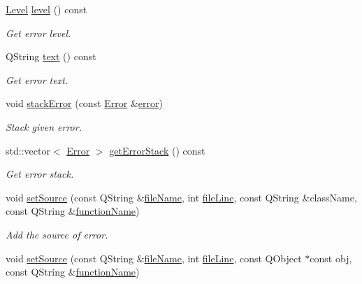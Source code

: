 \begin{DoxyCompactItemize}
\hyperlink{class_mdt_1_1_error_ab533dc690f68a8635232db594194a068}{Level} \hyperlink{class_mdt_1_1_error_a9c73117a49791ab87163b815d6a3e0c9}{level} () const 
\begin{DoxyCompactList}\small\item\em Get error level. \end{DoxyCompactList}\item 
Q\+String \hyperlink{class_mdt_1_1_error_a99327678615e8f2bddd22cd59482bfc2}{text} () const 
\begin{DoxyCompactList}\small\item\em Get error text. \end{DoxyCompactList}\item 
void \hyperlink{class_mdt_1_1_error_a4133276f217c5a6dac890a18059607cd}{stack\+Error} (const \hyperlink{class_mdt_1_1_error}{Error} \&\hyperlink{class_mdt_1_1_error_a0d042250a76d0351b8c19367572f5e11}{error})
\begin{DoxyCompactList}\small\item\em Stack given error. \end{DoxyCompactList}\item 
std\+::vector$<$ \hyperlink{class_mdt_1_1_error}{Error} $>$ \hyperlink{class_mdt_1_1_error_a6acc6143b706449ba1ff083286d5ccf6}{get\+Error\+Stack} () const 
\begin{DoxyCompactList}\small\item\em Get error stack. \end{DoxyCompactList}\item 
void \hyperlink{class_mdt_1_1_error_a785bdfbb360e3a29a465a9baeb1ac58b}{set\+Source} (const Q\+String \&\hyperlink{class_mdt_1_1_error_a5f7cdab03c2c0955693ace234039cd53}{file\+Name}, int \hyperlink{class_mdt_1_1_error_a5b887edc31341eb23557905e7a2d69ae}{file\+Line}, const Q\+String \&class\+Name, const Q\+String \&\hyperlink{class_mdt_1_1_error_a5706a74669219d9672ee20414f805cab}{function\+Name})
\begin{DoxyCompactList}\small\item\em Add the source of error. \end{DoxyCompactList}\item 
void \hyperlink{class_mdt_1_1_error_a38d1fb6f1d17a4a3d483ea367bdcb416}{set\+Source} (const Q\+String \&\hyperlink{class_mdt_1_1_error_a5f7cdab03c2c0955693ace234039cd53}{file\+Name}, int \hyperlink{class_mdt_1_1_error_a5b887edc31341eb23557905e7a2d69ae}{file\+Line}, const Q\+Object $\ast$const obj, const Q\+String \&\hyperlink{class_mdt_1_1_error_a5706a74669219d9672ee20414f805cab}{function\+Name})

\end{DoxyCompactItemize}
